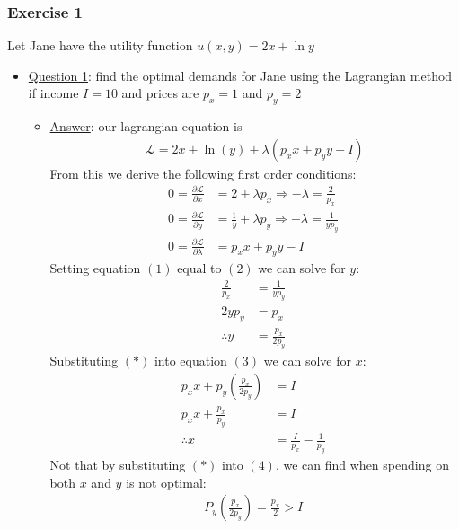 \documentclass{article}
\begin{document}
\subsubsection{Exercise 1}
Let Jane have the utility function $u(x,y) = 2x + \ln y$ \par \vspace{0.3em}
\begin{itemize}
  \item  \underline{Question 1}: find the optimal demands for Jane using the Lagrangian method if income $I = 10$ and prices are $p_{x} = 1$ and $p_{y} = 2$
  \begin{itemize}
    \item  \underline{Answer}: our lagrangian equation is
    \begin{gather*}
      \mathcal{L} = 2x + \ln(y) + \lambda (p_{x} x + p_{y}y - I)
    \end{gather*}
    From this we derive the following first order conditions:
    \begin{align*}
      0 = \tfrac{\partial \mathcal{L}}{\partial x} &= 2 + \lambda p_{x} \Rightarrow -\lambda = \frac{2}{p_{x}} \ \tag{1} \\
      0 = \frac{\partial \mathcal{L}}{\partial y} &= \frac{1}{y} + \lambda p_{y} \Rightarrow - \lambda = \tfrac{1}{yp_{y}} \ \tag{2} \\
      0 = \frac{\partial \mathcal{L}}{\partial \lambda} &= p_{x}x + p_{y}y - I \ \tag{3}
    \end{align*}
    Setting equation $(1)$ equal to $(2)$ we can solve for $y$:
    \begin{align*}
      \tfrac{2}{p_{x}} &= \tfrac{1}{y p_{y}} \\
      2y p_{y} &= p_{x} \ \tag{4} \\
      \therefore y &= \tfrac{p_{x}}{2p_{y}} \ \tag{*}
    \end{align*}
    Substituting $(*)$ into equation $(3)$ we can solve for $x$:
    \begin{align*}
      p_{x}x + p_{y}(\tfrac{p_{x}}{2p_{y}}) &= I \\
      p_{x}x + \frac{p_{x}}{p_{y}} &= I \\
      \therefore x &= \frac{I}{p_{x}} - \frac{1}{p_{y}} \ \tag{**}
    \end{align*}
    Not that by substituting $(*)$ into $(4)$, we can find when spending on both $x$ and $y$ is not optimal:
    \begin{gather*}
      P_{y}(\frac{p_{x}}{2p_{y}}) = \frac{p_{x}}{2} > I \ \tag{***}

\end{gather*}
\end{itemize}
\end{itemize}
\end{document}
